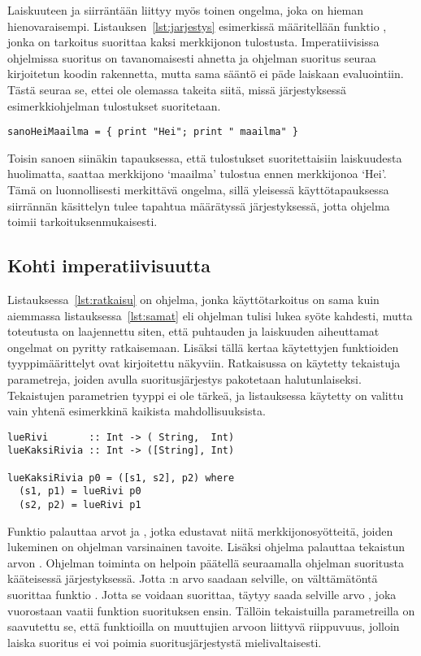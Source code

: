 \documentclass[finnish]{tktltiki2}
\begin{document}
Laiskuuteen ja siirräntään liittyy myös toinen ongelma, joka on hieman hienovaraisempi.
Listauksen~\ref{lst:jarjestys} esimerkissä määritellään funktio , jonka on
tarkoitus suorittaa kaksi merkkijonon tulostusta. Imperatiivisissa ohjelmissa suoritus on
tavanomaisesti ahnetta ja ohjelman suoritus seuraa kirjoitetun koodin rakennetta, mutta sama sääntö
ei päde laiskaan evaluointiin. Tästä seuraa se, ettei ole olemassa takeita siitä, missä
järjestyksessä esimerkkiohjelman tulostukset suoritetaan.

\begin{lstlisting}[float,label={lst:jarjestys},caption={Kahden tulostuksen pseudokoodi}]
sanoHeiMaailma = { print "Hei"; print " maailma" }
\end{lstlisting}

Toisin sanoen siinäkin tapauksessa, että tulostukset suoritettaisiin laiskuudesta huolimatta,
saattaa merkkijono `maailma' tulostua ennen merkkijonoa `Hei'. Tämä on luonnollisesti merkittävä
ongelma, sillä yleisessä käyttötapauksessa siirrännän käsittelyn tulee tapahtua määrätyssä
järjestyksessä, jotta ohjelma toimii tarkoituksenmukaisesti.

\subsection{Kohti imperatiivisuutta}

Listauksessa~\ref{lst:ratkaisu} on ohjelma, jonka käyttötarkoitus on sama kuin aiemmassa
listauksessa~\ref{lst:samat} eli ohjelman tulisi lukea syöte kahdesti, mutta toteutusta on
laajennettu siten, että puhtauden ja laiskuuden aiheuttamat ongelmat on pyritty ratkaisemaan.
Lisäksi tällä kertaa käytettyjen funktioiden tyyppimäärittelyt ovat kirjoitettu näkyviin.
Ratkaisussa on käytetty tekaistuja parametreja, joiden avulla suoritusjärjestys pakotetaan
halutunlaiseksi. Tekaistujen parametrien tyyppi ei ole tärkeä, ja listauksessa käytetty 
on valittu vain yhtenä esimerkkinä kaikista mahdollisuuksista.

\begin{lstlisting}[float,label={lst:ratkaisu},caption={Suoritusjärjestys riippuvuuksien avulla}]
lueRivi       :: Int -> ( String,  Int)
lueKaksiRivia :: Int -> ([String], Int)

lueKaksiRivia p0 = ([s1, s2], p2) where
  (s1, p1) = lueRivi p0
  (s2, p2) = lueRivi p1
\end{lstlisting}

Funktio  palauttaa arvot  ja , jotka edustavat niitä
merkkijonosyötteitä, joiden lukeminen on ohjelman varsinainen tavoite. Lisäksi ohjelma palauttaa
tekaistun arvon . Ohjelman toiminta on helpoin päätellä seuraamalla ohjelman suoritusta
kääteisessä järjestyksessä. Jotta :n arvo saadaan selville, on välttämätöntä suorittaa
funktio . Jotta se voidaan suorittaa, täytyy saada selville arvo , joka
vuorostaan vaatii funktion  suorituksen ensin. Tällöin tekaistuilla parametreilla
on saavutettu se, että funktioilla  on muuttujien arvoon liittyvä riippuvuus, jolloin
laiska suoritus ei voi poimia suoritusjärjestystä mielivaltaisesti.
\end{document}
